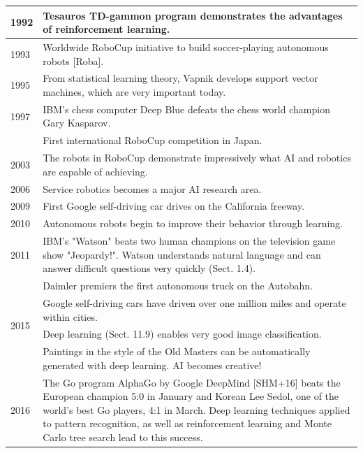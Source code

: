 \documentclass[10pt]{book}
\begin{document}
\begin{center}
\begin{tabular}{|l|l|}
\hline
1992 & Tesauros TD-gammon program demonstrates the advantages of reinforcement learning. \\
\hline
1993 & Worldwide RoboCup initiative to build soccer-playing autonomous robots [Roba]. \\
\hline
1995 & From statistical learning theory, Vapnik develops support vector machines, which are very important today. \\
\hline
1997 & IBM's chess computer Deep Blue defeats the chess world champion Gary Kasparov. \\
\hline
 & First international RoboCup competition in Japan. \\
\hline
2003 & The robots in RoboCup demonstrate impressively what AI and robotics are capable of achieving. \\
\hline
2006 & Service robotics becomes a major AI research area. \\
\hline
2009 & First Google self-driving car drives on the California freeway. \\
\hline
2010 & Autonomous robots begin to improve their behavior through learning. \\
\hline
2011 & IBM's "Watson" beats two human champions on the television game show "Jeopardy!". Watson understands natural language and can answer difficult questions very quickly (Sect. 1.4). \\
\hline
\multirow[t]{4}{*}{2015} & Daimler premiers the first autonomous truck on the Autobahn. \\
\hline
 & Google self-driving cars have driven over one million miles and operate within cities. \\
\hline
 & Deep learning (Sect. 11.9) enables very good image classification. \\
\hline
 & Paintings in the style of the Old Masters can be automatically generated with deep learning. AI becomes creative! \\
\hline
2016 & The Go program AlphaGo by Google DeepMind [SHM+16] beats the European champion 5:0 in January and Korean Lee Sedol, one of the world's best Go players, 4:1 in March. Deep learning techniques applied to pattern recognition, as well as reinforcement learning and Monte Carlo tree search lead to this success. \\
\hline
\end{tabular}
\end{center}
\end{document}
